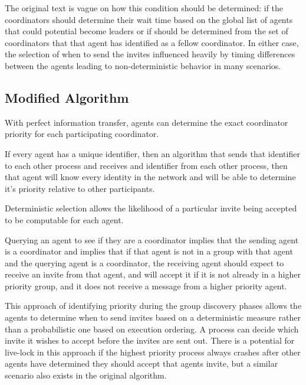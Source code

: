The original text is vague on how this condition should be determined: if the coordinators should determine their wait time based on the global list of agents that could potential become leaders or if should be determined from the set of coordinators that that agent has identified as a fellow coordinator. In either case, the selection of when to send the invites influenced heavily by timing differences between the agents leading to non-deterministic behavior in many scenarios.

\subsection{Modified Algorithm}

\begin{thm}
With perfect information transfer, agents can determine the exact coordinator priority for each participating coordinator.
\end{thm}

If every agent has a unique identifier, then an algorithm that sends that identifier to each other process and receives and identifier from each other process, then that agent will know every identity in the network and will be able to determine it's priority relative to other participants.

\begin{thm}
Deterministic selection allows the likelihood of a particular invite being accepted to be computable for each agent.
\end{thm}

Querying an agent to see if they are a coordinator implies that the sending agent is a coordinator and implies that if that agent is not in a group with that agent and the querying agent is a coordinator, the receiving agent should expect to receive an invite from that agent, and will accept it if it is not already in a higher priority group, and it does not receive a message from a higher priority agent.

This approach of identifying priority during the group discovery phases allows the agents to determine when to send invites based on a deterministic measure rather than a probabilistic one based on execution ordering. A process can decide which invite it wishes to accept before the invites are sent out. There is a potential for live-lock in this approach if the highest priority process always crashes after other agents have determined they should accept that agents invite, but a similar scenario also exists in the original algorithm.

